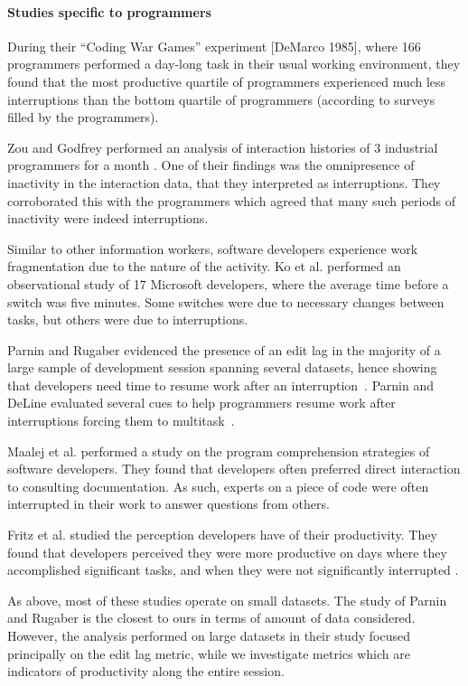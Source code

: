 \documentclass[times]{smrauth}
\begin{document}
\paragraph{Studies specific to programmers}


During their “Coding War Games” experiment [DeMarco 1985], where 166 programmers performed a day-long task in their usual working environment, they found that the most productive quartile of programmers experienced much less interruptions than the bottom quartile of programmers (according to surveys filled by the programmers).

Zou and Godfrey performed an analysis of interaction histories of 3 industrial programmers for a month \cite{ZG06}. One of their findings was the omnipresence of inactivity in the interaction data, that they interpreted as interruptions. They corroborated this with the programmers which agreed that many such periods of inactivity were indeed interruptions.

Similar to other information workers, software developers experience work fragmentation due to the nature of the activity. Ko et al. \cite{KDV07} performed an observational study of 17 Microsoft developers, where the average time before a switch was five minutes. Some switches were due to necessary changes between tasks, but others were due to interruptions. 

Parnin and Rugaber evidenced the presence of an edit lag in the majority of a large sample of development session spanning several datasets, hence showing that developers need time to resume work after an interruption~\cite{PR11}. Parnin and DeLine evaluated several cues  to help programmers resume work after interruptions forcing them to multitask~\cite{PD10}.

Maalej et al. \cite{MTRK14} performed a study on the program comprehension strategies of software developers. They found that developers often preferred direct interaction to consulting documentation. As such, experts on a piece of code were often interrupted in their work to answer questions from others.

Fritz et al. studied the perception developers have of their productivity. They found that developers perceived they were more productive on days where they accomplished significant tasks, and when they were not significantly interrupted \cite{MFMZ14}.

As above, most of these studies operate on small datasets. The study of Parnin and Rugaber is the closest to ours in terms of amount of data considered. However, the analysis performed on large datasets in their study focused principally on the edit lag metric, while we investigate metrics which are indicators of productivity along the entire session.
\end{document}
